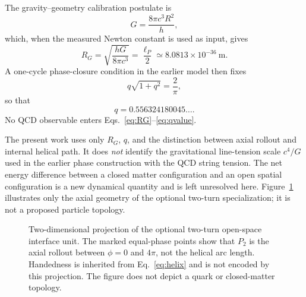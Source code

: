 \documentclass[10pt]{article}
\begin{document}
The gravity--geometry calibration postulate is
\begin{equation}
G=\frac{8\pi c^3R^2}{h},
\end{equation}
which, when the measured Newton constant is used as input, gives
\begin{equation}
R_G=\sqrt{\frac{hG}{8\pi c^3}}
=\frac{\ell_P}{2}
\simeq 8.0813\times10^{-36}\ \mathrm{m}.
\label{eq:RG}
\end{equation}
A one-cycle phase-closure condition in the earlier model then fixes
\begin{equation}
q\sqrt{1+q^2}=\frac{2}{\pi},
\label{eq:qclosure}
\end{equation}
so that
\begin{equation}
q=0.556324180045\ldots .
\label{eq:qvalue}
\end{equation}
No QCD observable enters Eqs.~\eqref{eq:RG}--\eqref{eq:qvalue}.

The present work uses only $R_G$, $q$, and the distinction between axial rollout and internal helical path.  It does \emph{not} identify the gravitational line-tension scale $c^4/G$ used in the earlier phase construction with the QCD string tension.  The net energy difference between a closed matter configuration and an open spatial configuration is a new dynamical quantity and is left unresolved here. Figure~\ref{fig:two_turn} illustrates only the axial geometry of the optional two-turn specialization; it is not a proposed particle topology.

\begin{figure}[t]
\centering
{}
\caption{Two-dimensional projection of the optional two-turn open-space interface unit. The marked equal-phase points show that $P_2$ is the axial rollout between $\phi=0$ and $4\pi$, not the helical arc length. Handedness is inherited from Eq.~\eqref{eq:helix} and is not encoded by this projection. The figure does not depict a quark or closed-matter topology.}
\label{fig:two_turn}
\end{figure}
\end{document}
